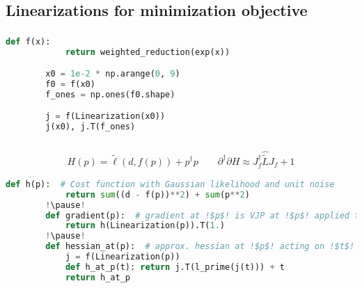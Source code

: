 \documentclass[aspectratio=169,xcolor=dvipsnames]{beamer}
\begin{document}
\subsection{Linearizations for minimization objective}
\begin{frame}[fragile]
	\frametitle{\insertsection}
	\framesubtitle{\insertsubsection}

	\begin{lstlisting}[language=python,escapechar=!]
		def f(x):
			return weighted_reduction(exp(x))

		x0 = 1e-2 * np.arange(0, 9)
		f0 = f(x0)
		f_ones = np.ones(f0.shape)

		j = f(Linearization(x0))
		j(x0), j.T(f_ones)
	\end{lstlisting}

\end{frame}

\begin{frame}[fragile]
	\frametitle{\insertsection}
	\framesubtitle{\insertsubsection}

	\begin{align*}
		H(p) = \tilde{\ell}(d, f(p)) + p^\dagger p \quad\quad \partial^\dagger \partial H \approx J_{f}^\dagger \widehat{\tilde{L}} J_{f} + 1
	\end{align*}

	\vspace{1em}
	\begin{lstlisting}[language=python,escapechar=!]
		def h(p):  # Cost function with Gaussian likelihood and unit noise
			return sum((d - f(p))**2) + sum(p**2)
		!\pause!
		def gradient(p):  # gradient at !$p$! is VJP at !$p$! applied to 1.
			return h(Linearization(p)).T(1.)
		!\pause!
		def hessian_at(p):  # approx. hessian at !$p$! acting on !$t$!
			j = f(Linearization(p))
			def h_at_p(t): return j.T(l_prime(j(t))) + t
			return h_at_p
	\end{lstlisting}

\end{frame}
\end{document}
